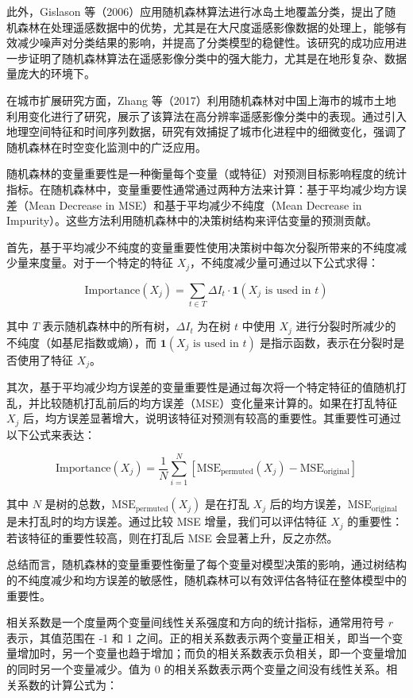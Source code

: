\documentclass[AutoFakeBold]{LZUThesis-PgD&PhD}
\begin{document}
	此外，Gislason 等（2006）应用随机森林算法进行冰岛土地覆盖分类，提出了随机森林在处理遥感数据中的优势，尤其是在大尺度遥感影像数据的处理上，能够有效减少噪声对分类结果的影响，并提高了分类模型的稳健性\cite{gislason2006}。该研究的成功应用进一步证明了随机森林算法在遥感影像分类中的强大能力，尤其是在地形复杂、数据量庞大的环境下。
	
	在城市扩展研究方面，Zhang 等（2017）利用随机森林对中国上海市的城市土地利用变化进行了研究，展示了该算法在高分辨率遥感影像分类中的表现\cite{zhang2017}。通过引入地理空间特征和时间序列数据，研究有效捕捉了城市化进程中的细微变化，强调了随机森林在时空变化监测中的广泛应用。
	
	随机森林的变量重要性是一种衡量每个变量（或特征）对预测目标影响程度的统计指标。在随机森林中，变量重要性通常通过两种方法来计算：基于平均减少均方误差（Mean Decrease in MSE）和基于平均减少不纯度（Mean Decrease in Impurity）。这些方法利用随机森林中的决策树结构来评估变量的预测贡献。
	
	首先，基于平均减少不纯度的变量重要性使用决策树中每次分裂所带来的不纯度减少量来度量。对于一个特定的特征 \( X_j \)，不纯度减少量可通过以下公式求得：
	
	\[
	\text{Importance}(X_j) = \sum_{t \in T} \Delta I_t \cdot \mathbf{1}(X_j \text{ is used in } t)
	\]
	
	其中 \( T \) 表示随机森林中的所有树，\( \Delta I_t \) 为在树 \( t \) 中使用 \( X_j \) 进行分裂时所减少的不纯度（如基尼指数或熵），而 \( \mathbf{1}(X_j \text{ is used in } t) \) 是指示函数，表示在分裂时是否使用了特征 \( X_j \)。
	
	其次，基于平均减少均方误差的变量重要性是通过每次将一个特定特征的值随机打乱，并比较随机打乱前后的均方误差（MSE）变化量来计算的。如果在打乱特征 \( X_j \) 后，均方误差显著增大，说明该特征对预测有较高的重要性。其重要性可通过以下公式来表达：
	
	\[
	\text{Importance}(X_j) = \frac{1}{N} \sum_{i=1}^{N} \left[ \text{MSE}_{\text{permuted}}(X_j) - \text{MSE}_{\text{original}} \right]
	\]
	
	其中 \( N \) 是树的总数，\( \text{MSE}_{\text{permuted}}(X_j) \) 是在打乱 \( X_j \) 后的均方误差，\( \text{MSE}_{\text{original}} \) 是未打乱时的均方误差。通过比较 MSE 增量，我们可以评估特征 \( X_j \) 的重要性：若该特征的重要性较高，则在打乱后 MSE 会显著上升，反之亦然。
	
	总结而言，随机森林的变量重要性衡量了每个变量对模型决策的影响，通过树结构的不纯度减少和均方误差的敏感性，随机森林可以有效评估各特征在整体模型中的重要性。
	
	相关系数是一个度量两个变量间线性关系强度和方向的统计指标，通常用符号 \( r \) 表示，其值范围在 -1 和 1 之间。正的相关系数表示两个变量正相关，即当一个变量增加时，另一个变量也趋于增加；而负的相关系数表示负相关，即一个变量增加的同时另一个变量减少。值为 0 的相关系数表示两个变量之间没有线性关系。相关系数的计算公式为：
	
\end{document}

